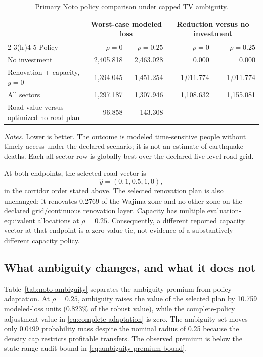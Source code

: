 \begin{table}[t]
\centering
\caption{Primary Noto policy comparison under capped TV ambiguity.}
\label{tab:noto-policy-results}
\small
\begin{tabular}{lrrrr}
\toprule
& \multicolumn{2}{c}{Worst-case modeled loss} &
\multicolumn{2}{c}{Reduction versus no investment}\\
\cmidrule(lr){2-3}\cmidrule(lr){4-5}
Policy & \(\rho=0\) & \(\rho=0.25\) & \(\rho=0\) & \(\rho=0.25\)\\
\midrule
No investment & 2{,}405.818 & 2{,}463.028 & 0.000 & 0.000\\
Renovation + capacity, \(y=0\) & 1{,}394.045 & 1{,}451.254
  & 1{,}011.774 & 1{,}011.774\\
All sectors & 1{,}297.187 & 1{,}307.946
  & 1{,}108.632 & 1{,}155.081\\
\midrule
Road value versus optimized no-road plan & 96.858 & 143.308 & -- & --\\
\bottomrule
\end{tabular}
\par\smallskip
\footnotesize\textit{Notes.} Lower is better. The outcome is modeled
time-sensitive people without timely access under the declared scenario;
it is not an estimate of earthquake deaths. Each all-sector row is
globally best over the declared five-level road grid.
\end{table}

At both endpoints, the selected road vector is
\begin{equation}
 \widehat y=(0,1,0.5,1,0),
\label{eq:noto-road-policy}
\end{equation}
in the corridor order stated above. The selected renovation plan is also
unchanged: it renovates 0.2769 of the Wajima zone and no other zone on the
declared grid/continuous renovation layer. Capacity has multiple
evaluation-equivalent allocations at \(\rho=0.25\). Consequently, a
different reported capacity vector at that endpoint is a zero-value tie,
not evidence of a substantively different capacity policy.

\subsection{What ambiguity changes, and what it does not}
\label{sec:noto-ambiguity}

Table~\ref{tab:noto-ambiguity} separates the ambiguity premium from policy
adaptation. At \(\rho=0.25\), ambiguity raises the value of the selected
plan by 10.759 modeled-loss units (0.823\% of the robust value), while the
complete-policy adjustment value in \eqref{eq:complete-adaptation} is zero.
The ambiguity set moves only 0.0499 probability mass despite the nominal
radius of 0.25 because the density cap restricts profitable transfers. The
observed premium is below the state-range audit bound in
\eqref{eq:ambiguity-premium-bound}.

